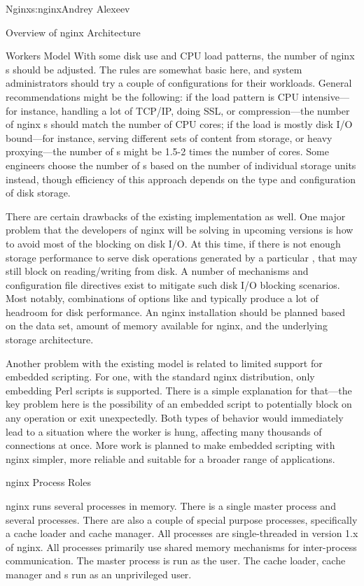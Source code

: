 \begin{aosachapter}{Nginx}{s:nginx}{Andrey Alexeev}
\begin{aosasect1}{Overview of nginx Architecture}
\begin{aosasect2}{Workers Model}
With some disk use and CPU load patterns, the number of nginx
s should be adjusted. The rules are somewhat basic here,
and system administrators should try a couple of configurations for
their workloads. General recommendations might be the following: if
the load pattern is CPU intensive---for instance, handling a lot of
TCP/IP, doing SSL, or compression---the number of nginx s
should match the number of CPU cores; if the load is mostly disk I/O
bound---for instance, serving different sets of content from storage,
or heavy proxying---the number of s might be 1.5-2
times the number of cores. Some engineers choose the number of
s based on the number of individual storage units
instead, though efficiency of this approach depends on the type and
configuration of disk storage.

There are certain drawbacks of the existing implementation as
well. One major problem that the developers of nginx will be solving
in upcoming versions is how to avoid most of the blocking on disk
I/O. At this time, if there is not enough storage performance to serve
disk operations generated by a particular , that
 may still block on reading/writing from disk. A number
of mechanisms and configuration file directives exist to mitigate such
disk I/O blocking scenarios. Most notably, combinations of options
like  and  typically produce a lot of
headroom for disk performance. An nginx installation should be planned
based on the data set, amount of memory available for nginx, and the
underlying storage architecture.

Another problem with the existing  model is related to
limited support for embedded scripting. For one, with the standard
nginx distribution, only embedding Perl scripts is supported. There is
a simple explanation for that---the key problem here is the
possibility of an embedded script to potentially block on any
operation or exit unexpectedly. Both types of behavior would
immediately lead to a situation where the worker is hung, affecting
many thousands of connections at once. More work is planned to make
embedded scripting with nginx simpler, more reliable and suitable for
a broader range of applications.

\end{aosasect2}

\begin{aosasect2}{nginx Process Roles}

nginx runs several processes in memory. There is a single master
process and several  processes. There are also a couple
of special purpose processes, specifically a cache loader and cache
manager. All processes are single-threaded in version 1.x of
nginx. All processes primarily use shared memory mechanisms for
inter-process communication. The master process is run as the
 user. The cache loader, cache manager and s
run as an unprivileged user.


\end{aosasect2}
\end{aosasect1}
\end{aosachapter}
